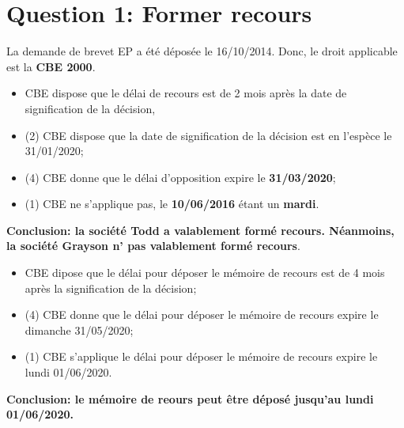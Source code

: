 \section{Question 1: Former recours}

La demande de brevet EP a été déposée le 16/10/2014.
Donc, le droit applicable est la \textbf{CBE 2000}.

\begin{itemize}
  \item {} CBE dispose que le délai de recours est de 
  2 mois après la date de signification de la décision,
  \item {}(2) CBE dispose que la date de signification
  de la décision est en l'espèce le 31/01/2020;
  \item {}(4) CBE donne que le délai d'opposition 
  expire le \textbf{31/03/2020};
  \item {}(1) CBE ne s'applique pas, le \textbf{10/06/2016}
  étant un \textbf{mardi}.\\
\end{itemize}

\textbf{Conclusion: la société Todd a valablement formé recours.
Néanmoins, la société Grayson n' pas valablement formé recours}.\\

\begin{itemize}
  \item {} CBE dipose que le délai pour déposer le mémoire
  de recours est de 4 mois après la signification de la décision;
  \item {}(4) CBE donne que le délai pour déposer le
  mémoire de recours expire le dimanche 31/05/2020;
  \item {}(1) CBE s'applique le délai pour déposer le
  mémoire de recours expire le lundi 01/06/2020.\\
\end{itemize}

\textbf{Conclusion: le mémoire de reours peut être déposé
jusqu'au lundi 01/06/2020.}